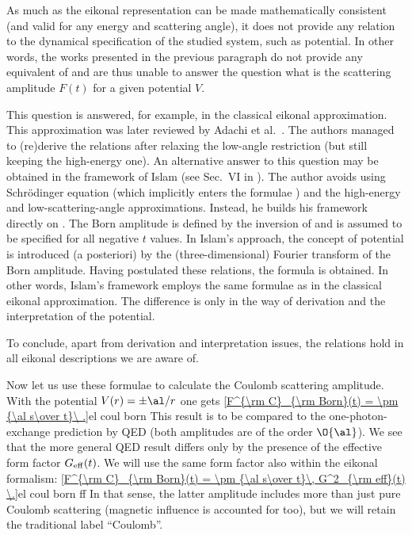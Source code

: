 As much as the eikonal representation  can be made mathematically consistent (and valid for any energy and scattering angle), it does not provide any relation to the dynamical specification of the studied system, such as potential. In other words, the works presented in the previous paragraph do not provide any equivalent of  and are thus unable to answer the question what is the scattering amplitude $F(t)$ for a given potential $V$.

This question is answered, for example, in the classical eikonal approximation. This approximation was later reviewed by Adachi et al.~. The authors managed to (re)derive the relations  after relaxing the low-angle restriction (but still keeping the high-energy one). An alternative answer to this question may be obtained in the framework of Islam (see Sec.~VI in ). The author avoids using Schr\" odinger equation (which implicitly enters the formulae ) and the high-energy and low-scattering-angle approximations. Instead, he builds his framework directly on . The Born amplitude is defined by the inversion of  and is assumed to be specified for all negative $t$ values. In Islam's approach, the concept of potential is introduced (a posteriori) by the (three-dimensional) Fourier transform of the Born amplitude. Having postulated these relations, the formula  is obtained. In other words, Islam's framework employs the same formulae  as in the classical eikonal approximation. The difference is only in the way of derivation and the interpretation of the potential. 

To conclude, apart from derivation and interpretation issues, the relations  hold in all eikonal descriptions we are aware of.

Now let us use these formulae to calculate the Coulomb scattering amplitude. With the potential $V(r) = \pm \al/r$ one gets
\eqref{F^{\rm C}_{\rm Born}(t) = \pm {\al s\over t}\ .}{el coul born}
This result is to be compared to the one-photon-exchange prediction by QED  (both amplitudes are of the order $\O{\al}$). We see that the more general QED result differs only by the presence of the effective form factor $G_{\rm eff}(t)$. We will use the same form factor also within the eikonal formalism:
\eqref{F^{\rm C}_{\rm Born}(t) = \pm {\al s\over t}\, G^2_{\rm eff}(t) \.}{el coul born ff}
In that sense, the latter amplitude includes more than just pure Coulomb scattering (magnetic influence is accounted for too), but we will retain the traditional label ``Coulomb''.


